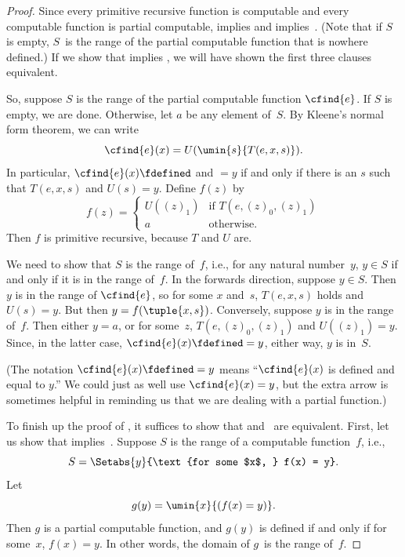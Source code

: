 \documentclass[../../../include/open-logic-section]{subfiles}
\begin{document}
\begin{proof}
Since every primitive recursive function is computable and every
computable function is partial computable, 
implies  and 
implies~. (Note that if $S$ is empty, $S$~is the
range of the partial computable function that is nowhere defined.) If
we show that  implies , we
will have shown the first three clauses equivalent.

So, suppose $S$ is the range of the partial computable function
$\cfind{e}$. If $S$ is empty, we are done. Otherwise, let $a$ be any
element of~$S$. By Kleene's normal form theorem, we can write
\[
\cfind{e}(x) = U(\umin{s}{T(e, x, s)}).
\]
In particular, $\cfind{e}(x) \fdefined$ and $= y$ if and only if there
is an $s$ such that $T(e, x, s)$ and $U(s) = y$. Define $f(z)$ by
\[
f(z) = \begin{cases}
  U((z)_1) & \text{if $T(e, (z)_0, (z)_1)$} \\
  a        & \text{otherwise.}
\end{cases}
\]
Then $f$ is primitive recursive, because $T$ and $U$
are. 

We need to show that $S$ is the range of~$f$, i.e., for any natural
number~$y$, $y \in S$ if and only if it is in the range of~$f$. In the
forwards direction, suppose $y \in S$. Then $y$ is in the range of
$\cfind{e}$, so for some $x$ and~$s$, $T(e,x,s)$ holds and $U(s) = y$.
But then $y = f(\tuple{x,s})$. Conversely, suppose $y$ is in the range
of~$f$. Then either $y = a$, or for some~$z$, $T(e,(z)_0,(z)_1)$ and
$U((z)_1) = y$. Since, in the latter case, $\cfind{e}(x) \fdefined =
y$, either way, $y$ is in~$S$.

(The notation $\cfind{e}(x) \fdefined = y$ means ``$\cfind{e}(x)$ is
defined and equal to $y$.'' We could just as well use $\cfind{e}(x) =
y$, but the extra arrow is sometimes helpful in reminding us that we
are dealing with a partial function.)

To finish up the proof of , it suffices to show
that  and~ are equivalent. First,
let us show that  implies~.
Suppose $S$ is the range of a computable function~$f$, i.e.,
\[
S = \Setabs{y}{\text{for some $x$, } f(x) = y}.
\]
Let
\[
g(y) = \umin{x}{(f(x) = y)}.
\]
Then $g$ is a partial computable function, and $g(y)$ is defined if
and only if for some~$x$, $f(x) = y$. In other words, the domain of
$g$~is the range of~$f$. 


\end{proof}
\end{document}

